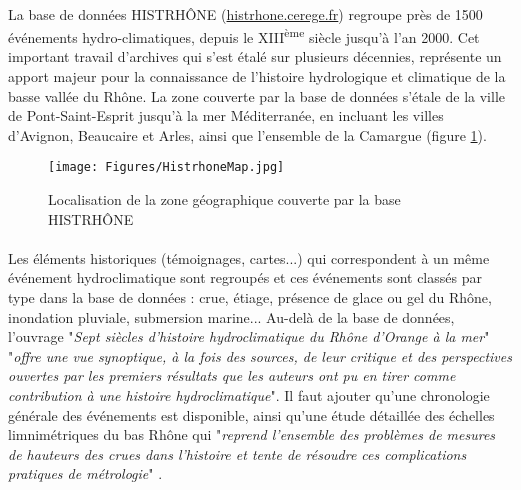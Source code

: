 \documentclass[11pt]{article}
\begin{document}
	\paragraph{} La base de données HISTRHÔNE (\url{histrhone.cerege.fr}) \citep{pichard_sept_2014} regroupe près de 1500 événements hydro-climatiques, depuis le XIII\textsuperscript{ème} siècle jusqu'à l'an 2000. Cet important travail d'archives qui s'est étalé sur plusieurs décennies, représente un apport majeur pour la connaissance de l'histoire hydrologique et climatique de la basse vallée du Rhône. La zone couverte par la base de données s'étale de la ville de Pont-Saint-Esprit jusqu'à la mer Méditerranée, en incluant les villes d'Avignon, Beaucaire et Arles, ainsi que l'ensemble de la Camargue (figure \ref{fig:MapHistrhone}). 
	
	\begin{figure}[h]
	\centering
		\texttt{[image: Figures/HistrhoneMap.jpg]}
        \caption{Localisation de la zone géographique couverte par la base HISTRHÔNE \citep{pichard_sept_2014} }
		\label{fig:MapHistrhone}
	\end{figure}
	
	\paragraph{} Les éléments historiques (témoignages, cartes...) qui correspondent à un même événement hydroclimatique sont regroupés et ces événements sont classés par type dans la base de données : crue, étiage, présence de glace ou gel du Rhône, inondation pluviale, submersion marine... Au-delà de la base de données, l'ouvrage "\textit{Sept siècles d'histoire hydroclimatique du Rhône d'Orange à la mer}" \citep{pichard_sept_2014} "\textit{offre une vue synoptique, à la fois des sources, de leur critique et des perspectives ouvertes par les premiers résultats que les auteurs ont pu en tirer comme contribution à une histoire hydroclimatique}". Il faut ajouter qu'une chronologie générale des événements est disponible, ainsi qu'une étude détaillée des échelles limnimétriques du bas Rhône qui "\textit{reprend l'ensemble des problèmes de mesures de hauteurs des crues dans l'histoire et tente de résoudre ces complications pratiques de métrologie}" \citep{pichard_hauteurs_2013} .
	
\end{document}
